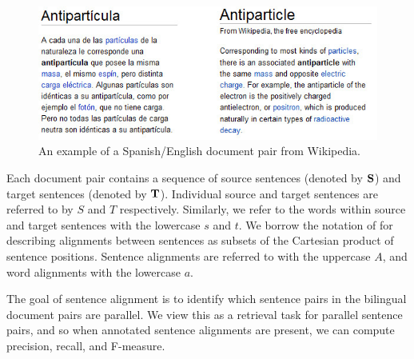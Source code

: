 \begin{figure}[ht]
\includegraphics[width=\textwidth]{images/wiki.jpg}
\caption{An example of a Spanish/English document pair from Wikipedia.}
\label{fig:wiki}
\end{figure}

Each document pair contains a sequence of source sentences (denoted by ${\bf
S}$) and target sentences (denoted by ${\bf T}$). Individual source and target
sentences are referred to by $S$ and $T$ respectively. Similarly, we refer to
the words within source and target sentences with the lowercase $s$ and $t$. We
borrow the notation of \citep{Och03} for describing alignments between sentences
as subsets of the Cartesian product of sentence positions. Sentence alignments
are referred to with the uppercase $A$, and word alignments with the lowercase
$a$.

The goal of sentence alignment is to identify which sentence pairs in the
bilingual document pairs are parallel. We view this as a retrieval task for
parallel sentence pairs, and so when annotated sentence alignments are present,
we can compute precision, recall, and F-measure.
